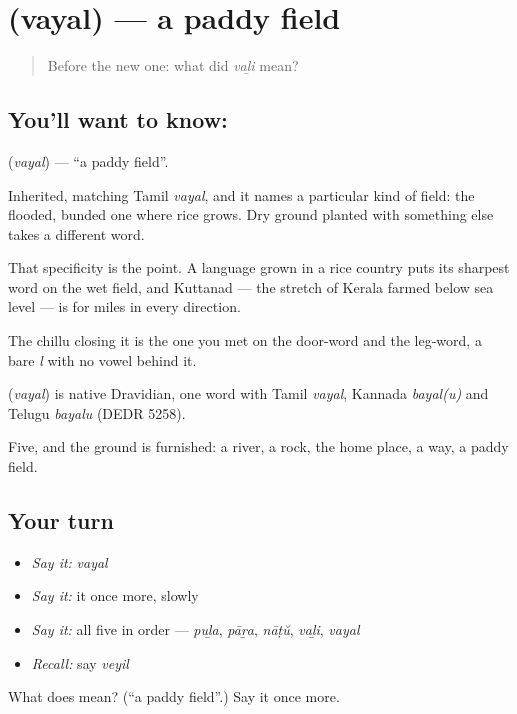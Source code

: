 \section[\texorpdfstring{\ml{വയൽ} (vayal)}{വയൽ (vayal)}]{ (vayal) — a paddy field}

\label{lesson:ML-C55-field}



\begin{quote}
Before the new one: what did \emph{vaḻi} mean?
\end{quote}

\subsection*{You'll want to know: }
\textbf{} (\emph{vayal}) — \textquotedblleft{}a paddy field\textquotedblright{}.

Inherited, matching Tamil \emph{vayal}, and it names a particular kind of field: the flooded, bunded one where rice grows. Dry ground planted with something else takes a different word.

That specificity is the point. A language grown in a rice country puts its sharpest word on the wet field, and Kuttanad — the stretch of Kerala farmed below sea level — is  for miles in every direction.

The chillu  closing it is the one you met on the door-word and the leg-word, a bare \emph{l} with no vowel behind it.

\begin{cousinweb}
\textbf{} (\emph{vayal}) is native Dravidian, one word with Tamil \emph{vayal}, Kannada \emph{bayal(u)} and Telugu \emph{bayalu} (DEDR 5258).
\end{cousinweb}

\begin{grammarlens}[title={What you've built}]
Five, and the ground is furnished: a river, a rock, the home place, a way, a paddy field.
\end{grammarlens}

\subsection*{Your turn}
\begin{itemize}
\raggedright
  \item \emph{Say it:} \emph{vayal}
  \item \emph{Say it:} it once more, slowly
  \item \emph{Say it:} all five in order — \emph{puḻa}, \emph{pāṟa}, \emph{nāṭŭ}, \emph{vaḻi}, \emph{vayal}
  \item \emph{Recall:} say \emph{veyil}
\end{itemize}

\begin{tcolorbox}[breakable,colback=teal!4,colframe=teal!35!black,title={Before you move on}]
What does  mean? (\textquotedblleft{}a paddy field\textquotedblright{}.) Say it once more.
\end{tcolorbox}
